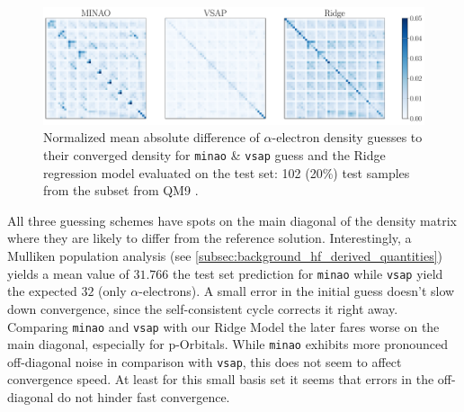 \begin{figure}[H]
    \centering
    \includegraphics[width=\textwidth]{../fig/c5h4n2o2/density_error_comparison.pdf}
    \caption[Normalized difference of density guesses]{Normalized mean absolute difference of $\alpha$-electron density guesses to their converged density for \texttt{minao} \& \texttt{vsap} guess and the Ridge regression model evaluated on the test set: 102 (20\%) test samples from the  subset from QM9 \parencite{ref:article1_qm9}.}
    \label{fig:density_error_comparison}
\end{figure}
All three guessing schemes have spots on the main diagonal of the density matrix where they are likely to differ from the reference solution. Interestingly, a Mulliken population analysis (see \autoref{subsec:background_hf_derived_quantities}) \parencite{ref:Mulliken_population_analysis} yields a mean value of $31.766$ the test set prediction for \texttt{minao} while \texttt{vsap} yield the expected $32$ (only $\alpha$-electrons). A small error in the initial guess doesn't slow down convergence, since the self-consistent cycle corrects it right away. Comparing \texttt{minao} and \texttt{vsap} with our Ridge Model the later fares worse on the main diagonal, especially for p-Orbitals. While \texttt{minao} exhibits more pronounced off-diagonal noise in comparison with \texttt{vsap}, this does not seem to affect convergence speed. At least for this small basis set it seems that errors in the off-diagonal do not hinder fast convergence.\\


